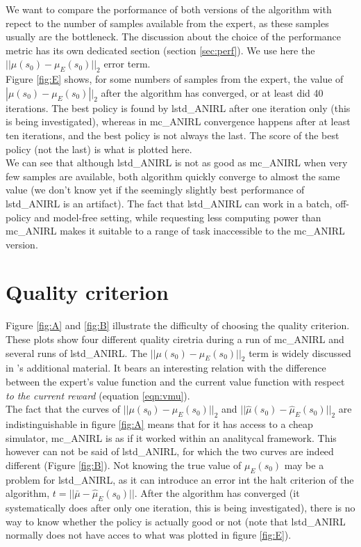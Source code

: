 \documentclass{article}
\begin{document}
We want to compare the porformance of both versions of the algorithm with repect to the number of samples available from the expert, as these samples usually are the bottleneck. The discussion about the choice of the performance metric has its own dedicated section (section \ref{sec:perf}). We use here the $||\mu(s_0) - \mu_E(s_0)||_2$ error term.\\

Figure \ref{fig:E} shows, for some numbers of samples from the expert, the value of $|\mu(s_0)-\mu_E(s_0)||_2$ after the algorithm has converged, or at least did 40 iterations. The best policy is found by lstd\_ANIRL after one iteration only (this is being investigated), whereas in mc\_ANIRL convergence happens after at least ten iterations, and the best policy is not always the last. The score of the best policy (not the last) is what is plotted here.\\

We can see that although lstd\_ANIRL is not as good as mc\_ANIRL when very few samples are available, both algorithm quickly converge to almost the same value (we don't know yet if the seemingly slightly best performance of lstd\_ANIRL is an artifact). The fact that lstd\_ANIRL can work in a batch, off-policy and model-free setting, while requesting less computing power than mc\_ANIRL makes it suitable to a range of task inaccessible to the mc\_ANIRL version.
\section{Quality criterion}

Figure \ref{fig:A} and \ref{fig:B} illustrate the difficulty of choosing the quality criterion. These plots show four different quality ciretria during a run of mc\_ANIRL and several runs of lstd\_ANIRL. The $||\mu(s_0) - \mu_E(s_0)||_2$ term is widely discussed in \citep{abbeel2004apprenticeship}'s additional material. It bears an interesting relation with the difference between the expert's value function and the current value function with respect \emph{to the current reward} (equation \ref{eqn:vmu}).\\

The fact that  the curves of  $||\mu(s_0) - \mu_E(s_0)||_2$ and $||\hat\mu(s_0) - \hat\mu_E(s_0)||_2$ are indistinguishable in figure \ref{fig:A} means that for it has access to a cheap simulator, mc\_ANIRL is as if it worked within an analitycal framework. This however can not be said of lstd\_ANIRL, for which the two curves are indeed different (Figure \ref{fig:B}). Not knowing the true value of $\mu_E(s_0)$ may be a problem for lstd\_ANIRL, as it can introduce an error int the halt criterion of the algorithm, $t = ||\bar\mu-\hat\mu_E(s_0)||$. After the algorithm has converged (it systematically does after only one iteration, this is being investigated), there is no way to know whether the policy is actually good or not (note that lstd\_ANIRL normally does not have acces to what was plotted in figure \ref{fig:E}).\\
\end{document}
